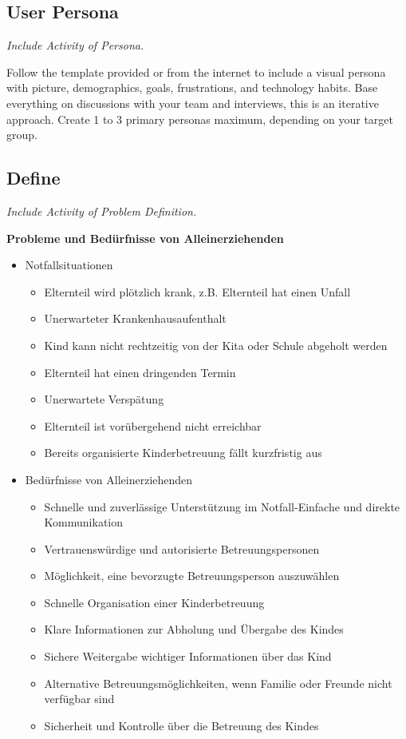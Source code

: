 \subsection{User Persona}
\emph{Include Activity of Persona.}

Follow the template provided or from the internet to include a visual persona with picture, demographics, goals, frustrations, and technology habits. Base everything on discussions with your team and interviews, this is an iterative approach. Create 1 to 3 primary personas maximum, depending on your target group.

\subsection{Define}
\emph{Include Activity of Problem Definition.}


\textbf{Probleme und Bedürfnisse von Alleinerziehenden}

\begin{itemize}
    \item Notfallsituationen
    \begin{itemize}
        \item Elternteil wird plötzlich krank, z.B. Elternteil hat einen Unfall
        \item Unerwarteter Krankenhausaufenthalt
        \item Kind kann nicht rechtzeitig von der Kita oder Schule abgeholt werden
        \item Elternteil hat einen dringenden Termin
        \item Unerwartete Verspätung
        \item Elternteil ist vorübergehend nicht erreichbar
        \item Bereits organisierte Kinderbetreuung fällt kurzfristig aus
    \end{itemize}
    
    \item Bedürfnisse von Alleinerziehenden
    \begin{itemize}
        \item Schnelle und zuverlässige Unterstützung im Notfall-Einfache und direkte Kommunikation
        \item Vertrauenswürdige und autorisierte Betreuungspersonen
        \item Möglichkeit, eine bevorzugte Betreuungsperson auszuwählen
        \item Schnelle Organisation einer Kinderbetreuung
        \item Klare Informationen zur Abholung und Übergabe des Kindes
        \item Sichere Weitergabe wichtiger Informationen über das Kind
        \item Alternative Betreuungsmöglichkeiten, wenn Familie oder Freunde nicht verfügbar sind
        \item Sicherheit und Kontrolle über die Betreuung des Kindes
    \end{itemize}
\end{itemize}


